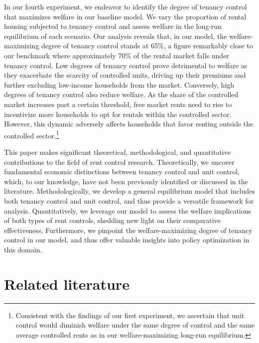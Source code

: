 \documentclass[parskip=full]{article}
\begin{document}
In our fourth experiment, we endeavor to identify the degree of tenancy control that maximizes welfare in our baseline model. We vary the proportion of rental housing subjected to tenancy control and assess welfare in the long-run equilibrium of each scenario. Our analysis reveals that, in our model, the welfare-maximizing degree of tenancy control stands at 65\%, a figure remarkably close to our benchmark where approximately 70\% of the rental market falls under tenancy control. Low degrees of tenancy control prove detrimental to welfare as they exacerbate the scarcity of controlled units, driving up their premiums and further excluding low-income households from the market. Conversely, high degrees of tenancy control also reduce welfare. As the share of the controlled market increases past a certain threshold, free market rents need to rise to incentivize more households to opt for rentals within the controlled sector. However, this dynamic adversely affects households that favor renting outside the controlled sector.\footnote{Consistent with the findings of our first experiment, we ascertain that unit control would diminish welfare under the same degree of control and the same average controlled rents as in our welfare-maximizing long-run equilibrium.}

This paper makes significant theoretical, methodological, and quantitative contributions to the field of rent control research. Theoretically, we uncover fundamental economic distinctions between tenancy control and unit control, which, to our knowledge, have not been previously identified or discussed in the literature. Methodologically, we develop a general equilibrium model that includes both tenancy control and unit control, and thus provide a versatile framework for analysis. Quantitatively, we leverage our model to assess the welfare implications of both types of rent controls, shedding new light on their comparative effectiveness. Furthermore, we pinpoint the welfare-maximizing degree of tenancy control in our model, and thus offer valuable insights into policy optimization in this domain.

\section{Related literature}\label{sec:related_lit}
\end{document}
